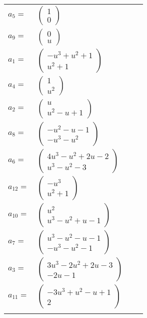 \documentclass[1p]{elsarticle_modified}
\theoremstyle{definition}
\begin{document}
\begin{tabular}{m{7pt} m{180pt} m{7pt} m{180pt} }
\flushright $a_{5}=$&$\begin{pmatrix}1\\0\end{pmatrix}$ \\
\flushright $a_{9}=$&$\begin{pmatrix}0\\u\end{pmatrix}$ \\
\flushright $a_{1}=$&$\begin{pmatrix}- u^3+u^2+1\\u^2+1\end{pmatrix}$ \\
\flushright $a_{4}=$&$\begin{pmatrix}1\\u^2\end{pmatrix}$ \\
\flushright $a_{2}=$&$\begin{pmatrix}u\\u^2- u+1\end{pmatrix}$ \\
\flushright $a_{8}=$&$\begin{pmatrix}- u^2- u-1\\- u^3- u^2\end{pmatrix}$ \\
\flushright $a_{6}=$&$\begin{pmatrix}4 u^3- u^2+2 u-2\\u^3- u^2-3\end{pmatrix}$ \\
\flushright $a_{12}=$&$\begin{pmatrix}- u^3\\u^2+1\end{pmatrix}$ \\
\flushright $a_{10}=$&$\begin{pmatrix}u^2\\u^3- u^2+u-1\end{pmatrix}$ \\
\flushright $a_{7}=$&$\begin{pmatrix}u^3- u^2- u-1\\- u^3- u^2-1\end{pmatrix}$ \\
\flushright $a_{3}=$&$\begin{pmatrix}3 u^3-2 u^2+2 u-3\\-2 u-1\end{pmatrix}$ \\
\flushright $a_{11}=$&$\begin{pmatrix}-3 u^3+u^2- u+1\\2\end{pmatrix}$\\&\end{tabular}
\end{document}
